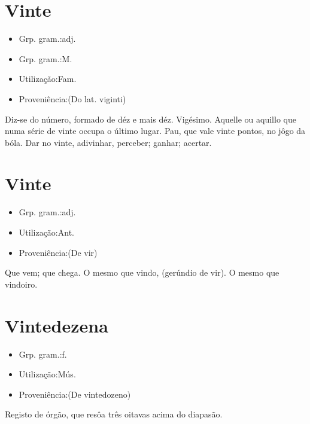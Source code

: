 \documentclass{article}
\begin{document}
\section{Vinte}
\begin{itemize}
\item {Grp. gram.:adj.}
\end{itemize}
\begin{itemize}
\item {Grp. gram.:M.}
\end{itemize}
\begin{itemize}
\item {Utilização:Fam.}
\end{itemize}
\begin{itemize}
\item {Proveniência:(Do lat. \textunderscore viginti\textunderscore )}
\end{itemize}
Diz-se do número, formado de déz e mais déz.
Vigésimo.
Aquelle ou aquillo que numa série de vinte occupa o último lugar.
Pau, que vale vinte pontos, no jôgo da bóla.
\textunderscore Dar no vinte\textunderscore , adivinhar, perceber; ganhar; acertar.
\section{Vinte}
\begin{itemize}
\item {Grp. gram.:adj.}
\end{itemize}
\begin{itemize}
\item {Utilização:Ant.}
\end{itemize}
\begin{itemize}
\item {Proveniência:(De \textunderscore vir\textunderscore )}
\end{itemize}
Que vem; que chega.
O mesmo que \textunderscore vindo\textunderscore , (gerúndio de \textunderscore vir\textunderscore ).
O mesmo que \textunderscore vindoiro\textunderscore .
\section{Vintedezena}
\begin{itemize}
\item {Grp. gram.:f.}
\end{itemize}
\begin{itemize}
\item {Utilização:Mús.}
\end{itemize}
\begin{itemize}
\item {Proveniência:(De \textunderscore vintedozeno\textunderscore )}
\end{itemize}
Registo de órgão, que resôa três oitavas acima do diapasão.
\end{document}
